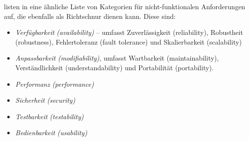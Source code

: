 
\citeauthor{Bass2003} listen in \autocite{Bass2003} eine ähnliche Liste von Kategorien für nicht-funktionalen Anforderungen auf, die ebenfalls als Richtschnur dienen kann. Diese sind:

\begin{itemize}
  \item \textit{Verfügbarkeit} \textit{(availability)} -- umfasst Zuverlässigkeit (reliability), Robustheit (robustness), Fehlertoleranz (fault tolerance) und Skalierbarkeit (scalability)
  \item \textit{Anpassbarkeit} \textit{(modifiability)}, umfasst Wartbarkeit (maintainability), Verständlichkeit (understandability) und Portabilität (portability).
  \item \textit{Performanz} \textit{(performance)}
  \item \textit{Sicherheit} \textit{(security)}
  \item \textit{Testbarkeit} \textit{(testability)}
  \item \textit{Bedienbarkeit} \textit{(usability)}
\end{itemize}

